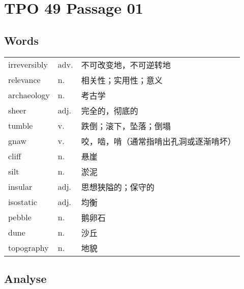 \section{TPO 49 Passage 01}

\subsection{Words}

\begin{tabular}{lll}
    irreversibly & adv. & 不可改变地，不可逆转地         \\
    relevance    & n.   & 相关性；实用性；意义          \\
    archaeology  & n.   & 考古学                 \\
    sheer        & adj. & 完全的，彻底的             \\
    tumble       & v.   & 跌倒；滚下，坠落；倒塌         \\
    gnaw         & v.   & 咬，啮，啃（通常指啃出孔洞或逐渐啃坏） \\
    cliff        & n.   & 悬崖                  \\
    silt         & n.   & 淤泥                  \\
    insular      & adj. & 思想狭隘的；保守的           \\
    isostatic    & adj. & 均衡                  \\
    pebble       & n.   & 鹅卵石                 \\
    dune         & n.   & 沙丘                  \\
    topography   & n.   & 地貌                  \\
\end{tabular}

\subsection{Analyse}

